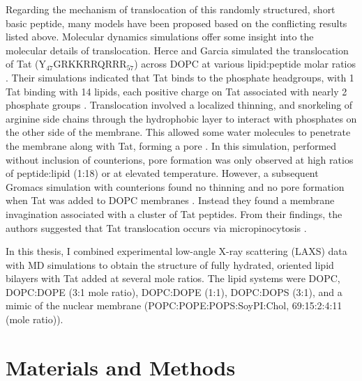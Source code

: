 Regarding the mechanism of translocation of this randomly structured, short 
basic peptide, many models have been proposed based on the conflicting results 
listed above. Molecular dynamics simulations offer some insight into the 
molecular details of translocation. Herce and Garcia simulated the 
translocation of Tat (Y$_{47}$GRKKRRQRRR$_{57}$) across DOPC at various 
lipid:peptide molar ratios \cite{Herce07}. Their simulations indicated that Tat 
binds to the phosphate headgroups, with 1 Tat binding with 14 lipids, each 
positive charge on Tat associated with nearly 2 phosphate groups \cite{Herce07}. 
Translocation involved a localized thinning, and snorkeling of arginine side 
chains through the hydrophobic layer to interact with phosphates on
the other side of the membrane. This allowed some water molecules to penetrate 
the membrane along with Tat, forming a pore \cite{Herce07}. In this simulation, 
performed without inclusion of counterions, pore formation was only observed at 
high ratios of peptide:lipid (1:18) or at elevated temperature. However, a 
subsequent Gromacs simulation with counterions found no thinning and no pore 
formation when Tat was added to DOPC membranes \cite{Yesylevskyy09}. Instead they 
found a membrane invagination associated with a cluster of Tat peptides. From 
their findings, the authors suggested that
Tat translocation occurs via micropinocytosis \cite{Yesylevskyy09}. 

In this thesis, I combined experimental low-angle X-ray scattering (LAXS) 
data with MD simulations to obtain the structure of fully hydrated, oriented 
lipid bilayers with Tat added at several mole ratios. The lipid systems 
were DOPC, DOPC:DOPE (3:1 mole ratio), DOPC:DOPE (1:1), DOPC:DOPS (3:1), and a 
mimic of the nuclear membrane (POPC:POPE:POPS:SoyPI:Chol, 69:15:2:4:11 (mole ratio)). 

\section{Materials and Methods}
